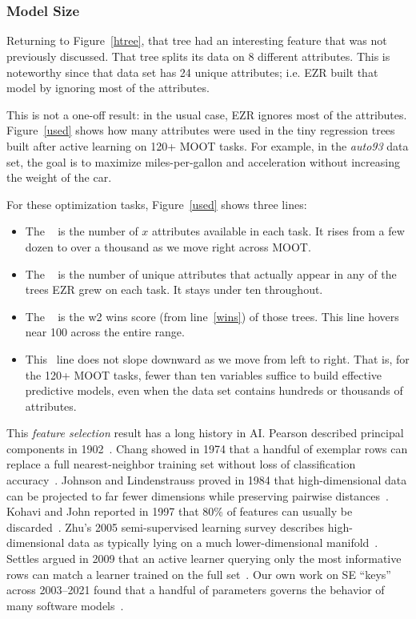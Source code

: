 \documentclass[AMA,STIX2COL]{WileyNJDv5}
\newcommand{\IT}{{\sffamily EZR}}
\begin{document}
{ ~\\~\\
\subsubsection{Model Size}

 
Returning to Figure~\ref{htree}, that tree 
had an interesting feature that was not previously discussed. 
That tree splits its data on 8 different  attributes.
This is noteworthy since that data  set has 24 unique attributes;
i.e. EZR  built that model by ignoring most of the attributes.


This is not a one-off result: in the usual case,
EZR ignores most of the attributes.
Figure~\ref{used} shows how many attributes were used
in the tiny regression trees built after active
learning on   120+ MOOT tasks. 
 For example, in the {\em auto93} data set,
the goal is to maximize miles-per-gallon and acceleration without
increasing the weight of the car.

For these optimization tasks, Figure~\ref{used} shows three lines:

\begin{itemize}
\item The \color{darkyellow}{\bf yellow line}\color{black}~ is
the number of $x$ attributes available in each task. It rises
from a few dozen to over a thousand as we move right across
MOOT.
\item The \color{red}{\bf red line}\color{black}~ is the number
of unique attributes that actually appear in any of the trees
\IT{} grew on each task. It stays under ten throughout.
\item The \color{blue}{\bf blue line}\color{black}~ is the
\textsf{w2} 
\textsf{wins} score (from line~\ref{wins}) of those trees. 
This line  hovers near 100 across the entire range.
\item
This  \color{blue}{\bf blue line}\color{black}~line does not slope downward as we move from left to right. 
That is, 
for the  120+ MOOT tasks, fewer than ten variables suffice to
build effective predictive models, even when the data set
contains hundreds or thousands of attributes.
\end{itemize}
This {\em feature selection} result
has a long history in AI. Pearson described principal
components in 1902~\cite{pca}. Chang showed in 1974 that a
handful of exemplar rows can replace a full nearest-neighbor
training set without loss of classification
accuracy~\cite{chang74}. Johnson and Lindenstrauss proved in
1984 that high-dimensional data can be projected to far fewer
dimensions while preserving pairwise
distances~\cite{johnson1984extensions}. Kohavi and John reported
in 1997 that 80\% of features can usually be
discarded~\cite{kohavi97}. Zhu's 2005 semi-supervised learning
survey describes high-dimensional data as typically lying on a
much lower-dimensional manifold~\cite{zhu2005semi}. Settles
argued in 2009 that an active learner querying only the most
informative rows can match a learner trained on the full
set~\cite{settles2009active}. Our own work on SE ``keys'' across
2003--2021 found that a handful of parameters governs the
behavior of many software
models~\cite{me03a,me07a,me21a,menzies2008implications}.

}
\end{document}
